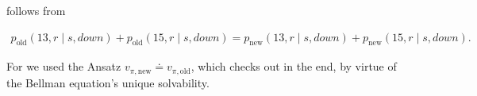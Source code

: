 \begin{solution}
\begin{enumerate}[label = \arabic*.]
    \Quote{!} follows from

    \begin{align*}
        p_\text{old}(13, r \mid s, \mathit{down})
        +
        p_\text{old}(15, r \mid s, \mathit{down})
        =
        p_\text{new}(13, r \mid s, \mathit{down})
        +
        p_\text{new}(15, r \mid s, \mathit{down}).
    \end{align*}

    For \Quote{!} we used the Ansatz $v_{\pi, \text{new}} \doteq v_{\pi, \text{old}}$, which checks out in the end, by virtue of the Bellman equation's unique solvability.

\end{enumerate}

\end{solution}

